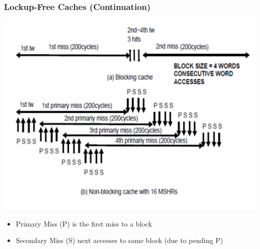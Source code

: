 \documentclass{beamer}
\begin{document}
\begin{frame}[fragile,t]
\frametitle{Lockup-Free Caches (Continuation)}


\includegraphics[width=44ex]{FigsMemH/PrimSecMiss}

\begin{itemize}
    \item Primary Miss (P) is the first miss to a block
    \item Secondary Miss (S) next accesses to same block {\scriptsize (due to pending P)} 
        \begin{itemize}
        \end  {itemize}
\end  {itemize}
\end{frame}
\end{document}

